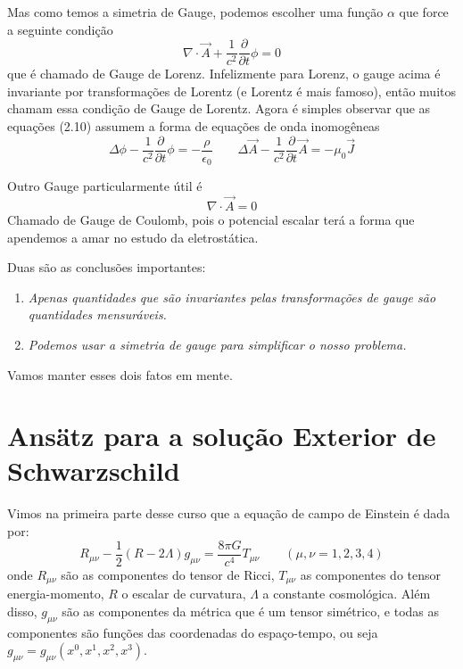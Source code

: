 \documentclass[11pt]{article}
\begin{document}
Mas como temos a simetria de Gauge, podemos escolher uma função
\(\alpha\) que force a seguinte condição
\[ \nabla \cdot \vec{A} + \frac{1}{c^2} \frac{\partial}{\partial t}\phi = 0 \]
que é chamado de Gauge de Lorenz. Infelizmente para Lorenz, o gauge
acima é invariante por transformações de Lorentz (e Lorentz é mais
famoso), então muitos chamam essa condição de Gauge de Lorentz. Agora é
simples observar que as equações (2.10) assumem a forma de equações de
onda inomogêneas
\[ \tag{2.11} \Delta \phi - \frac{1}{c^2} \frac{\partial}{\partial t} \phi = - \frac{\rho}{\epsilon_0}
\qquad \Delta \vec{A} - \frac{1}{c^2} \frac{\partial}{\partial t}  \vec{A} = - \mu_0 \vec{J}
\]

Outro Gauge particularmente útil é
\[ \tag{2.12} \nabla\cdot \vec{A} = 0 \] Chamado de Gauge de Coulomb,
pois o potencial escalar terá a forma que apendemos a amar no estudo da
eletrostática.

Duas são as conclusões importantes:

\begin{enumerate}
\def\labelenumi{\arabic{enumi})}
\item
  \emph{Apenas quantidades que são invariantes pelas transformações de
  gauge são quantidades mensuráveis.}
\item
  \emph{Podemos usar a simetria de gauge para simplificar o nosso
  problema.}
\end{enumerate}

Vamos manter esses dois fatos em mente.

    \hypertarget{ansuxe4tz-para-a-soluuxe7uxe3o-exterior-de-schwarzschild}{%
\section{Ansätz para a solução Exterior de
Schwarzschild}\label{ansuxe4tz-para-a-soluuxe7uxe3o-exterior-de-schwarzschild}}

    Vimos na primeira parte desse curso que a equação de campo de Einstein é
dada por:
\[ \tag{3.1} R_{\mu\nu} - \frac{1}{2} (R - 2 \Lambda) g_{\mu\nu} = \frac{8 \pi G}{c^4} T_{\mu\nu} \qquad (\mu, \nu = 1,2,3,4)\]
onde \(R_{\mu\nu}\) são as componentes do tensor de Ricci,
\(T_{\mu\nu}\) as componentes do tensor energia-momento, \(R\) o escalar
de curvatura, \(\Lambda\) a constante cosmológica. Além disso,
\(g_{\mu\nu}\) são as componentes da métrica que é um tensor simétrico,
e todas as componentes são funções das coordenadas do espaço-tempo, ou
seja \(g_{\mu\nu}=g_{\mu\nu}(x^0, x^1, x^2, x^3)\).
\end{document}
